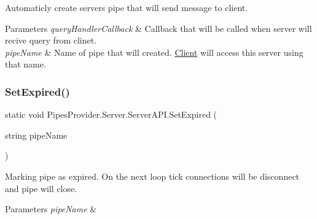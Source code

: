 Automaticly create server\textquotesingle{}s pipe that will send message to client. 


\begin{DoxyParams}{Parameters}
{\em query\+Handler\+Callback} & Callback that will be called when server will recive query from clinet.\\
\hline
{\em pipe\+Name} & Name of pipe that will created. \mbox{\hyperlink{namespace_pipes_provider_1_1_client}{Client}} will access this server using that name.\\
\hline
\end{DoxyParams}
\mbox{\label{class_pipes_provider_1_1_server_1_1_server_a_p_i_a750e3c4f0e34e61724ab3914d0d0608e}} 
\subsubsection{\texorpdfstring{Set\+Expired()}{SetExpired()}\hspace{0.1cm}{\footnotesize\ttfamily [1/2]}}
{\footnotesize\ttfamily static void Pipes\+Provider.\+Server.\+Server\+A\+P\+I.\+Set\+Expired (\begin{DoxyParamCaption}\item[{string}]{pipe\+Name }\end{DoxyParamCaption})\hspace{0.3cm}{\ttfamily [static]}}



Marking pipe as expired. On the next loop tick connections will be disconnect and pipe will close. 


\begin{DoxyParams}{Parameters}
{\em pipe\+Name} & \\
\hline
\end{DoxyParams}
\mbox{\label{class_pipes_provider_1_1_server_1_1_server_a_p_i_a6f3fd6e9d69f4bb96ba5f3c3738cf439}} 
